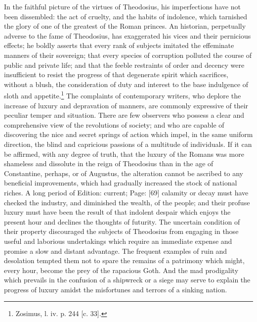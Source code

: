 In the faithful picture of the virtues of Theodosius, his imperfections have not been dissembled: the act of cruelty, and the habits of indolence, which tarnished the glory of one of the greatest of the Roman princes. An historian, perpetually adverse to the fame of Theodosius, has exaggerated his vices and their pernicious effects; he boldly asserts that every rank of subjects imitated the effeminate manners of their sovereign; that every species of corruption polluted the course of public and private life; and that the feeble restraints of order and decency were insufficient to resist the progress of that degenerate spirit which sacrifices, without a blush, the consideration of duty and interest to the base indulgence of sloth and appetite.\footnote{Zosimus, l. iv. p. 244 [c. 33].} The complaints of contemporary writers, who deplore the increase of luxury and depravation of manners, are commonly expressive of their peculiar temper and situation. There are few observers who possess a clear and comprehensive view of the revolutions of society; and who are capable of discovering the nice and secret springs of action which impel, in the same uniform direction, the blind and capricious passions of a multitude of individuals. If it can be affirmed, with any degree of truth, that the luxury of the Romans was more shameless and dissolute in the reign of Theodosius than in the age of Constantine, perhaps, or of Augustus, the alteration cannot be ascribed to any beneficial improvements, which had gradually increased the stock of national riches. A long period of Edition: current; Page: [69] calamity or decay must have checked the industry, and diminished the wealth, of the people; and their profuse luxury must have been the result of that indolent despair which enjoys the present hour and declines the thoughts of futurity. The uncertain condition of their property discouraged the subjects of Theodosius from engaging in those useful and laborious undertakings which require an immediate expense and promise a slow and distant advantage. The frequent examples of ruin and desolation tempted them not to spare the remains of a patrimony which might, every hour, become the prey of the rapacious Goth. And the mad prodigality which prevails in the confusion of a shipwreck or a siege may serve to explain the progress of luxury amidst the misfortunes and terrors of a sinking nation.

